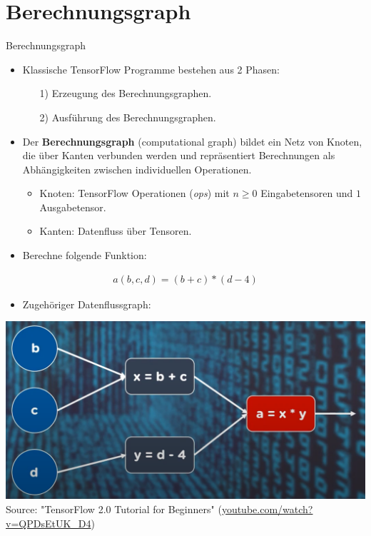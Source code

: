 \documentclass[utf8, smaller, c]{beamer}
\begin{document}
\section{Berechnungsgraph}
\begin{frame}{Berechnungsgraph}
	\begin{itemize}
		\item Klassische TensorFlow Programme bestehen aus 2 Phasen:
		\begin{itemize}
			\item[1)] Erzeugung des Berechnungsgraphen.
			\item[2)] Ausführung des Berechnungsgraphen.
		\end{itemize}
		\item Der \textbf{Berechnungsgraph} (computational graph) bildet ein Netz von Knoten, die über Kanten verbunden werden und repräsentiert Berechnungen als Abhängigkeiten zwischen individuellen Operationen.
		\begin{itemize}
			\item Knoten: TensorFlow Operationen (\textit{ops}) mit $n \geq 0$ Eingabetensoren und $1$ Ausgabetensor.
			\item Kanten: Datenfluss über Tensoren.
		\end{itemize}
	\end{itemize}
	
	\framebreak
	
	\begin{itemize}
	    \item Berechne folgende Funktion:\\[-3mm]
	\end{itemize}
	\begin{align*}
	    a(b,c,d)=(b+c)*(d-4)
	\end{align*}
	\vspace*{-8mm}
	\begin{itemize}
	    \item Zugehöriger Datenflussgraph:
	\end{itemize}
	\begin{center}
	    \includegraphics[scale=0.2]{pics/datagraph_example.png}\\
	    {\tiny Source: "TensorFlow 2.0 Tutorial for Beginners" (\url{youtube.com/watch?v=QPDsEtUK_D4})}
	\end{center}
	

\end{frame}
\end{document}
